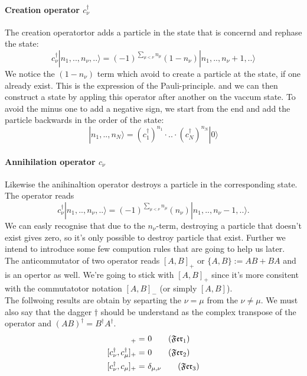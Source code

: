 \documentclass[../main.tex]{subfile}
\begin{document}
\paragraph{Creation operator $c_\nu^{\dagger}$}
The creation operatortor adds a particle in the state that is concernd and rephase the state:
\[
    c_{\nu}^{\dagger} |n_{1},..,n_{\nu},..\rangle = (-1)^{\sum_{\mu<\nu}n_{\mu}} (1-n_{\nu})|n_{1},..,n_{\nu}+1,..\rangle
\]
We notice the $ (1-n_{\nu})$ term which avoid to create a particle at the state, if one already exist. This is the expression of
the Pauli-principle. 
and we can then construct a state by appling this operator after another on the vaccum state. To avoid the minus one to add a negative sign, we start from the 
end and add the particle backwards in the order of the state:
\[
    |n_{1},..,n_{N}\rangle = (c_{1}^{\dagger})^{n_{1}}\cdot ..\cdot (c_{N}^{\dagger})^{n_{N}} |0\rangle
\]  

\paragraph{Annihilation operator $c_\nu$}
Likewise the anihinaltion operator destroys a particle in the corresponding state. The operator reads
\[
    c_{\nu}^{\dagger} |n_{1},..,n_{\nu},..\rangle = (-1)^{\sum_{\mu<\nu}n_{\mu}} (n_{\nu})|n_{1},..,n_{\nu}-1,..\rangle.
\]
We can easly recognise that due to the $n_{\nu}$-term, destroying a particle that doesn't exist gives zero, 
so it's only possible to destroy particle that exist. Further we intend to introduce some few compution 
rules that are going to help us later. \\

The anticommutator of two operator reads $[A,B]_{+}$ or $\{A,B\} := AB + BA$ and is an opertor as well.
We're going to stick with $[A,B]_{+}$ since it's more consitent with the commutatotor notation $[A,B]_{-}$ (or simply $[A,B]$).\\

The follwoing results are obtain by separting the $\nu = \mu$ from the $\nu \neq \mu$. We must also say that the dagger $\dagger$ 
should be understand as the complex transpose of the operator and $(AB)^{\dagger} = B^{\dagger}A^{\dagger}$.
\begin{align}
    [c_{\nu},c_{\mu}]_+ =&~ 0 \label{eq:Fermion1} \tag{$\mathfrak{Fer}_1$}\\
    [c^{\dagger}_{\nu},c^{\dagger}_{\mu}]_+ =&~0 \label{eq:Fermion2} \tag{$\mathfrak{Fer}_2$}\\
    [c^{\dagger}_{\nu},c_{\mu}]_+ =&~ \delta_{\mu,\nu}\label{eq:Fermion3} \tag{$\mathfrak{Fer}_3$}
\end{align} 
\end{document}

